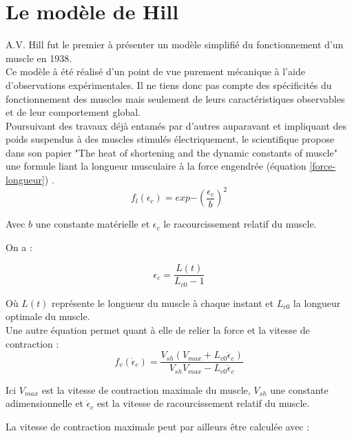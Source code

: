 \section{Le modèle de Hill}
A.V. Hill fut le premier à présenter un modèle simplifié du fonctionnement d'un muscle en 1938.\\
Ce modèle à été réalisé d'un point de vue purement mécanique à l'aide d'observations expérimentales. Il ne tiens donc pas compte des spécificités du fonctionnement des muscles mais seulement de leurs caractéristiques observables et de leur comportement global.\\

Poursuivant des travaux déjà entamés par d'autres auparavant et impliquant des poids suspendus à des muscles stimulés électriquement, le scientifique propose dans son papier "The heat of shortening and the dynamic constants of muscle" \cite{hill_archibald_vivian_heat_1938} une formule liant la longueur musculaire à la force engendrée (équation \ref{force-longueur}) \cite{berranen_simulation_2015}.\\

\begin{equation}
    \label{force-longueur}
    f_l(\epsilon_c) = exp{- (\frac{\epsilon_c}{b})^2}
\end{equation}

Avec $b$ une constante matérielle et $\epsilon_c$ le racourcissement relatif du muscle.

On a : 

\begin{equation}
    \epsilon_c = \frac{L(t)}{L_{c0}-1}
\end{equation}

Où $L(t)$ représente le longueur du muscle à chaque instant et $L_{c0}$ la longueur optimale du muscle.\\ 

Une autre équation permet quant à elle de relier la force et la vitesse de contraction \cite{berranen_simulation_2015} : 
\begin{equation}
    \label{force-vitesse}
    f_v(\dot\epsilon_c) = \frac{V_{sh}(V_{max}+L_{c0} \dot\epsilon_c)}{V_{sh} V_{max}- L_{c0} \dot\epsilon_c}
\end{equation}

Ici $V_{max}$ est la vitesse de contraction maximale du muscle, $V_{sh}$ une constante adimensionnelle et $\dot\epsilon_c$ est la vitesse de racourcissement relatif du muscle. 

La vitesse de contraction maximale peut par ailleurs être calculée avec : 

